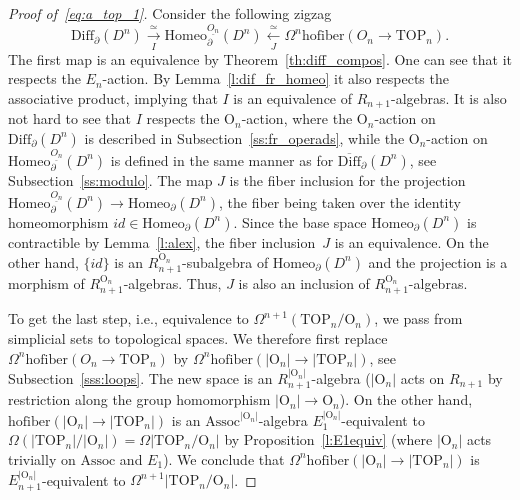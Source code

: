\documentclass[11pt]{amsart}
\theoremstyle{definition}
\newcommand{\Diffn}{\mathrm{Diff}_\partial(D^n)}
\newcommand{\Dbarn}{\overline{\mathrm{Diff}}_\partial(D^n)}
\newcommand{\Homeo}{\mathrm{Homeo}}
\newcommand{\TOP}{\mathrm{TOP}}
\newcommand{\OO}{\mathrm{O}}
\newcommand{\hofiber}{\mathrm{hofiber}}
\newcommand{\Assoc}{\mathrm{Assoc}}
\numberwithin{equation}{section}
\begin{document}
\begin{proof}[Proof of~\eqref{eq:a_top_1}]
Consider the following zigzag
\[
\Diffn\xrightarrow[I]{\,\simeq\,}\Homeo_\partial^{\underline{O_n}}(D^n)\xleftarrow[J]{\,\simeq\,}\Omega^n\hofiber(O_n\to\TOP_n).
\]
The first map is an equivalence by Theorem~\ref{th:diff_compos}. One can see that it respects the $E_n$-action. By Lemma~\ref{l:dif_fr_homeo} it  also respects the associative product, implying that $I$ is an equivalence of 
$R_{n+1}$-algebras. It is also not hard to see that $I$ respects the $\OO_{n}$-action, where the $\OO_{n}$-action on $\Diffn$ is described in Subsection~\ref{ss:fr_operads}, while the $\OO_n$-action on 
$\Homeo_\partial^{\underline{O_n}}(D^n)$ is defined in the same manner as for $\Dbarn$,
see Subsection~\ref{ss:modulo}. The map $J$ is the fiber inclusion  for the projection
$\Homeo_\partial^{\underline{O_n}}(D^n)\to \Homeo_\partial(D^n)$, the fiber 
 being taken over the
identity homeomorphism $id\in \Homeo_\partial(D^n)$. Since the base space $\Homeo_\partial(D^n)$ is contractible by Lemma~\ref{l:alex}, the fiber inclusion~$J$ is an equivalence. On the other hand, $\{id\}$
is an $R_{n+1}^{\OO_n}$-subalgebra of $\Homeo_\partial(D^n)$ and the projection is a morphism
of $R_{n+1}^{\OO_n}$-algebras. Thus, $J$ is also an inclusion of $R_{n+1}^{\OO_n}$-algebras.

To get the last step, i.e., equivalence to $\Omega^{n+1}\left(\TOP_n/ \OO_n\right)$, we pass from
simplicial sets to topological spaces. %
 We therefore first replace $\Omega^n\hofiber\left(O_n\to\TOP_n\right)$
by $\Omega^n\hofiber\left(|\OO_n|\to|\TOP_n|\right)$, see Subsection~\ref{sss:loops}. The new space
is an $R_{n+1}^{|\OO_n|}$-algebra ($|\OO_n|$ acts on $R_{n+1}$ by restriction along the group homomorphism $|\OO_n|\to \OO_n$). On the other hand, $\hofiber\left(|\OO_n|\to|\TOP_n|\right)$ is an $\Assoc^{|\OO_n|}$-algebra
$E_1^{|\OO_n|}$-equivalent to 
$\Omega\left(|\TOP_n|/|\OO_n|\right)=\Omega\left|\TOP_n/\OO_n\right|$ by Proposition~\ref{l:E1equiv} (where $|\OO_n|$ acts trivially on $\Assoc$ and $E_1$). We conclude that 
 $\Omega^n\hofiber\left(|\OO_n|\to|\TOP_n|\right)$ is $E_{n+1}^{|\OO_n|}$-equivalent to 
$\Omega^{n+1}\left|\TOP_n/\OO_n\right|$.
\end{proof}
\end{document}
